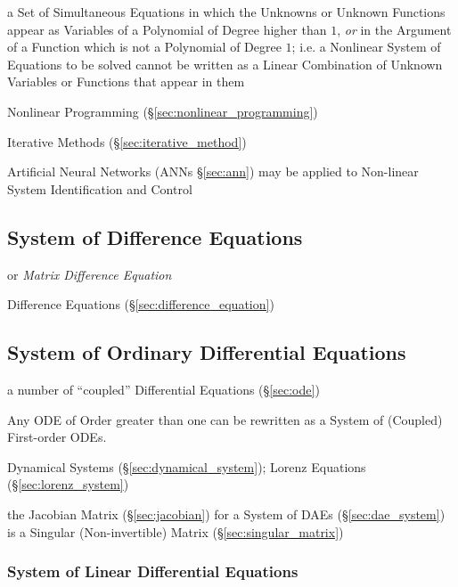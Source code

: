 a Set of Simultaneous Equations in which the Unknowns or Unknown Functions
appear as Variables of a Polynomial of Degree higher than $1$, \emph{or} in the
Argument of a Function which is not a Polynomial of Degree $1$; i.e. a
Nonlinear System of Equations to be solved cannot be written as a Linear
Combination of Unknown Variables or Functions that appear in them

\fist Nonlinear Programming (\S\ref{sec:nonlinear_programming})

\fist Iterative Methods (\S\ref{sec:iterative_method})

\fist Artificial Neural Networks (ANNs \S\ref{sec:ann}) may be applied to
Non-linear System Identification and Control



\subsection{System of Difference Equations}
\label{sec:difference_equation_system}

or \emph{Matrix Difference Equation}

Difference Equations (\S\ref{sec:difference_equation})



\subsection{System of Ordinary Differential Equations}\label{sec:ode_system}

a number of ``coupled'' Differential Equations (\S\ref{sec:ode})

Any ODE of Order greater than one can be rewritten as a System of (Coupled)
First-order ODEs.

\fist Dynamical Systems (\S\ref{sec:dynamical_system}); Lorenz Equations
(\S\ref{sec:lorenz_system})

\fist the Jacobian Matrix (\S\ref{sec:jacobian}) for a System of DAEs
(\S\ref{sec:dae_system}) is a Singular (Non-invertible) Matrix
(\S\ref{sec:singular_matrix})



\subsubsection{System of Linear Differential Equations}
\label{sec:linear_ode_system}

